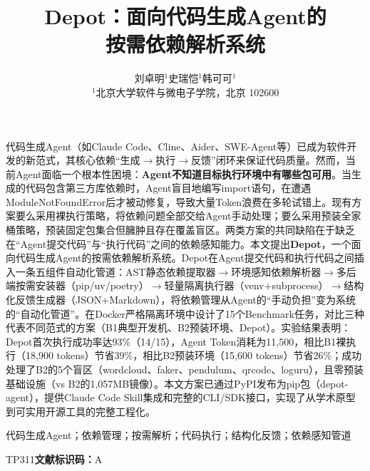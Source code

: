 \documentclass[10pt]{ctexart}
\begin{document}
\title{\vspace{1cm} {\heiti Depot：面向代码生成Agent的\\按需依赖解析系统}}

\author{
\small
刘卓明$^1$\quad 史瑞恺$^1$\quad 韩可可$^1$ \\[2mm]
\footnotesize
$^1$北京大学软件与微电子学院，北京 102600
}

\maketitle

\vspace{-0.5cm}
\ignorespaces
代码生成Agent（如Claude Code、Cline、Aider、SWE-Agent等）已成为软件开发的新范式，其核心依赖“生成$\rightarrow$执行$\rightarrow$反馈”闭环来保证代码质量。然而，当前Agent面临一个根本性困境：\textbf{Agent不知道目标执行环境中有哪些包可用}。当生成的代码包含第三方库依赖时，Agent盲目地编写import语句，在遭遇ModuleNotFoundError后才被动修复，导致大量Token浪费在多轮试错上。现有方案要么采用裸执行策略，将依赖问题全部交给Agent手动处理；要么采用预装全家桶策略，预装固定包集合但臃肿且存在覆盖盲区。两类方案的共同缺陷在于缺乏在“Agent提交代码”与“执行代码”之间的依赖感知能力。本文提出\textbf{Depot}，一个面向代码生成Agent的按需依赖解析系统。Depot在Agent提交代码和执行代码之间插入一条五组件自动化管道：AST静态依赖提取器$\rightarrow$环境感知依赖解析器$\rightarrow$多后端按需安装器（pip/uv/poetry）$\rightarrow$轻量隔离执行器（venv+subprocess）$\rightarrow$结构化反馈生成器（JSON+Markdown），将依赖管理从Agent的“手动负担”变为系统的“自动化管道”。在Docker严格隔离环境中设计了15个Benchmark任务，对比三种代表不同范式的方案（B1典型开发机、B2预装环境、Depot）。实验结果表明：Depot首次执行成功率达93\%（14/15），Agent Token消耗为11,500，相比B1裸执行（18,900 tokens）节省39\%，相比B2预装环境（15,600 tokens）节省26\%；成功处理了B2的5个盲区（wordcloud、faker、pendulum、qrcode、loguru），且零预装基础设施（vs B2的1,057MB镜像）。本文方案已通过PyPI发布为pip包（depot-agent），提供Claude Code Skill集成和完整的CLI/SDK接口，实现了从学术原型到可实用开源工具的完整工程化。

\medskip
{}代码生成Agent；依赖管理；按需解析；代码执行；结构化反馈；依赖感知管道

\medskip
{}TP311\quad\textbf{文献标识码：}A
\end{document}

